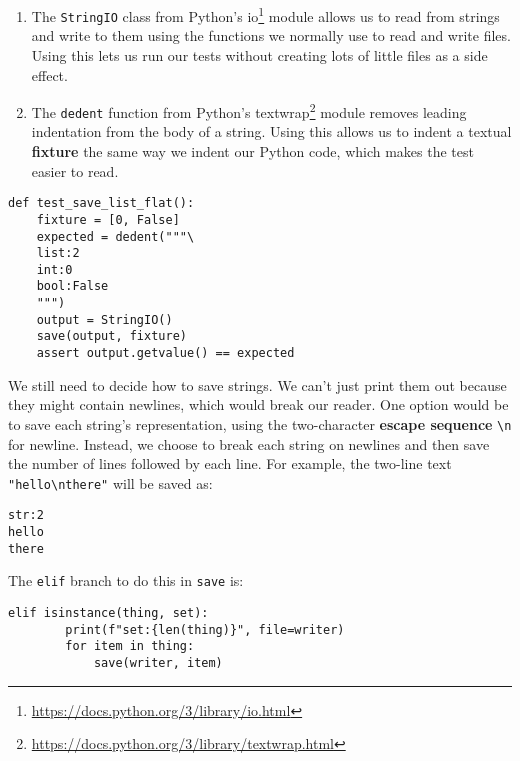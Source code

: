 \documentclass{scrbook}
\newcommand{\glossref}[1]{\textbf{#1}}
\newcommand{\hreffoot}[2]{{#1}\footnote{\href{#2}{#2}}}
\begin{document}
\begin{enumerate}

\item 

The \texttt{StringIO} class from Python's \hreffoot{io}{https://docs.python.org/3/library/io.html} module
    allows us to read from strings and write to them
    using the functions we normally use to read and write files.
    Using this lets us run our tests
    without creating lots of little files as a side effect.



\item 

The \texttt{dedent} function from Python's \hreffoot{textwrap}{https://docs.python.org/3/library/textwrap.html} module
    removes leading indentation from the body of a string.
    Using this allows us to indent a textual \glossref{fixture}
    the same way we indent our Python code,
    which makes the test easier to read.



\end{enumerate}


\begin{lstlisting}[frame=single,frameround=tttt]
def test_save_list_flat():
    fixture = [0, False]
    expected = dedent("""\
    list:2
    int:0
    bool:False
    """)
    output = StringIO()
    save(output, fixture)
    assert output.getvalue() == expected
\end{lstlisting}



We still need to decide how to save strings.
We can't just print them out because they might contain newlines,
which would break our reader.
One option would be to save each string's representation,
using the two-character \glossref{escape sequence} \texttt{{\textbackslash}n} for newline.
Instead,
we choose to break each string on newlines
and then save the number of lines
followed by each line.
For example,
the two-line text \texttt{"hello{\textbackslash}nthere"} will be saved as:

\begin{lstlisting}[frame=single,frameround=tttt]
str:2
hello
there
\end{lstlisting}


The \texttt{elif} branch to do this in \texttt{save} is:


\begin{lstlisting}[frame=single,frameround=tttt]
    elif isinstance(thing, set):
        print(f"set:{len(thing)}", file=writer)
        for item in thing:
            save(writer, item)
\end{lstlisting}
\end{document}
